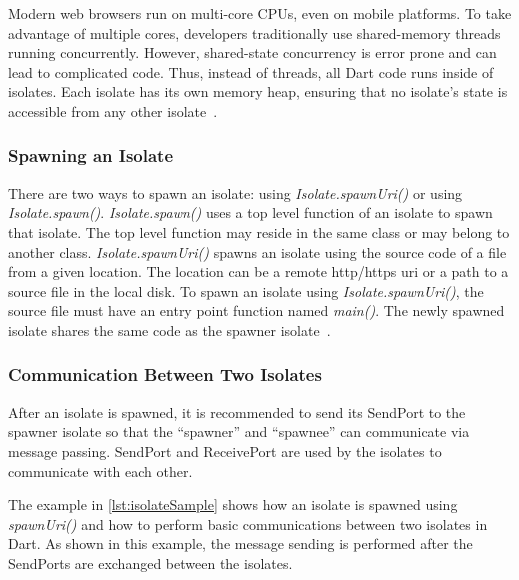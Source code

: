   Modern web browsers run on multi-core CPUs, even on mobile platforms. To take advantage of multiple cores, developers traditionally use shared-memory threads running concurrently. However, shared-state concurrency is error prone and can lead to complicated code. Thus, instead of threads, all Dart code runs inside of isolates. Each isolate has its own memory heap, ensuring that no isolate’s state is accessible from any other isolate~\parencite{laddWalrath}.

  \subsubsection{Spawning an Isolate}
    There are two ways to spawn an isolate: using \emph{Isolate.spawnUri()} or using \emph{Isolate.spawn()}. \emph{Isolate.spawn()} uses a top level function of an isolate to spawn that isolate. The top level function may reside in the same class or may belong to another class. \emph{Isolate.spawnUri()} spawns an isolate using the source code of a file from a given location. The location can be a remote http/https \acrshort{uri} or a path to a source file in the local disk. To spawn an isolate using \emph{Isolate.spawnUri()}, the source file must have an entry point function named \emph{main()}.
    The newly spawned isolate shares the same code as the spawner isolate~\cite{dartApiIsolate}.

  \subsubsection{Communication Between Two Isolates}
  After an isolate is spawned, it is recommended to send its SendPort to the spawner isolate so that the “spawner” and “spawnee” can communicate via message passing. SendPort and ReceivePort are used by the isolates to communicate with each other.

  The example in \autoref{lst:isolateSample} shows how an isolate is spawned using \emph{spawnUri()} and how to perform basic communications between two isolates in Dart. As shown in this example, the message sending is performed after the SendPorts are exchanged between the isolates.

